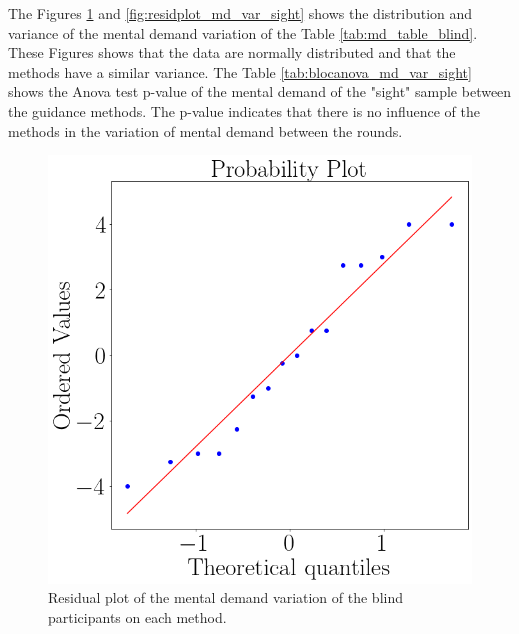 

The Figures \ref{fig:qqplot_md_var_sight} and \ref{fig:residplot_md_var_sight} shows the distribution and variance of the mental demand variation of the Table \ref{tab:md_table_blind}. These Figures shows that the data are normally distributed and that the methods have a similar variance.
The Table \ref{tab:blocanova_md_var_sight} shows the Anova test p-value of the mental demand of the "sight" sample between the guidance methods. The p-value indicates that there is no influence of the methods in the variation of mental demand between the rounds. 



\begin{figure}[!htb]
    \centering
    \begin{minipage}{0.45\textwidth}
        \centering
        \includegraphics[width = 0.8\linewidth]{Resultados/Nasa/Figuras/png/qqplot_md_var_sight.png}
        \caption{Residual plot of the mental demand variation of the blind participants on each method.}
        \label{fig:qqplot_md_var_sight}
    \end{minipage}
    \begin{minipage}{0.45\textwidth}
        \centering

\end{minipage}
\end{figure}
